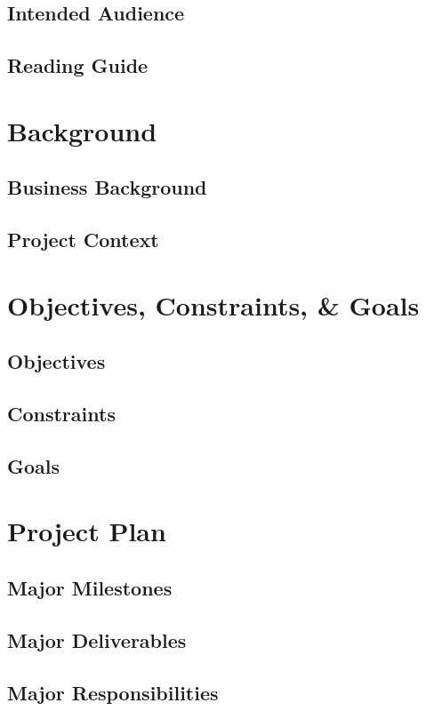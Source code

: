 \documentclass[10pt,letterpaper]{article}
\begin{document}
\subsection{Intended Audience}
\subsection{Reading Guide}

\section{Background}

\subsection{Business Background}

\subsection{Project Context}

\section{Objectives, Constraints, \& Goals}
\subsection{Objectives}
\subsection{Constraints}
\subsection{Goals}

\section{Project Plan}

\subsection{Major Milestones}
\subsection{Major Deliverables}
\subsection{Major Responsibilities}
\end{document}
